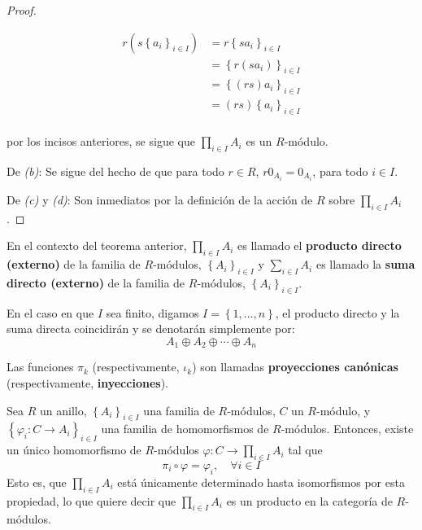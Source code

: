 \documentclass[12pt]{report}
\newcounter{it}
\theoremstyle{largebreak}
\newcommand\cf[3]{\ensuremath{#1:#2\rightarrow#3}}
\begin{document}
\begin{proof}
\begin{enumerate}[label = \textit{(\arabic*)}]
            \begin{equation*}
                \begin{split}
                    r\left(s\left\{a_i \right\}_{ i\in I} \right)&=r\left\{sa_i \right\}_{ i\in I}\\
                    &=\left\{r(sa_i) \right\}_{ i\in I}\\
                    &=\left\{(rs)a_i \right\}_{ i\in I}\\
                    &=(rs)\left\{a_i \right\}_{ i\in I}\\
                \end{split}
            \end{equation*}
        \end{enumerate}
        por los incisos anteriores, se sigue que $\prod_{ i\in I}A_i$ es un $R$-módulo.

        De \textit{(b)}: Se sigue del hecho de que para todo $r\in R$, $r0_{A_i}=0_{A_i}$, para todo $i\in I$.

        De \textit{(c)} y \textit{(d)}: Son inmediatos por la definición de la acción de $R$ sobre $\prod_{ i\in I}A_i$.
    \end{proof}

    \begin{mydef}
        En el contexto del teorema anterior, $\prod_{ i\in I}A_i$ es llamado el \textbf{producto directo (externo)} de la familia de $R$-módulos, $\left\{A_i \right\}_{ i\in I}$ y $\sum_{ i\in I}A_i$ es llamado la \textbf{suma directo (externo)} de la familia de $R$-módulos, $\left\{A_i \right\}_{ i\in I}$.

        En el caso en que $I$ sea finito, digamos $I=\left\{1,...,n \right\}$, el producto directo y la suma directa coincidirán y se denotarán simplemente por:
        \begin{equation*}
            A_1\oplus A_2\oplus\cdots\oplus A_n
        \end{equation*}

        Las funciones $\pi_k$ (respectivamente, $\iota_k$) son llamadas \textbf{proyecciones canónicas} (respectivamente, \textbf{inyecciones}).
    \end{mydef}

    \begin{theor}
        Sea $R$ un anillo, $\left\{A_i \right\}_{ i\in I}$ una familia de $R$-módulos, $C$ un $R$-módulo, y $\left\{\cf{\varphi_i}{C}{A_i} \right\}_{ i\in I}$ una familia de homomorfismos de $R$-módulos. Entonces, existe un único homomorfismo de $R$-módulos $\cf{\varphi}{C}{\prod_{ i\in I}A_i}$ tal que
        \begin{equation*}
            \pi_i\circ \varphi=\varphi_i,\quad\forall i\in I
        \end{equation*}
        Esto es, que $\prod_{ i\in I}A_i$ está únicamente determinado hasta isomorfismos por esta propiedad, lo que quiere decir que $\prod_{ i\in I}A_i$ es un producto en la categoría de $R$-módulos.
    \end{theor}
\end{document}
